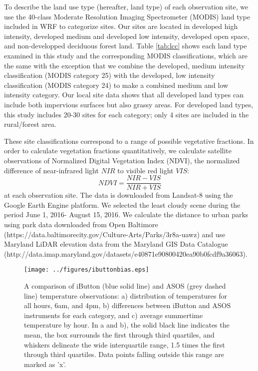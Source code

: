 \documentclass[draft,linenumbers]{agujournal}
\begin{document}
 To describe the land use type (hereafter, land type) of each observation site, we use the 40-class Moderate Resolution Imaging Spectrometer (MODIS) land type included in WRF to categorize sites. Our sites are located in developed high intensity, developed medium and developed low intensity, developed open space, and non-developped deciduous forest land.
 Table \ref{tab:lcc} shows each land type examined in this study and the corresponding MODIS classifications, which are the same with the exception that we combine the developed, medium intensity classification (MODIS category 25) with the developed, low intensity classification (MODIS category 24) to make a combined medium and low intensity category. Our local site data shows that all developed land types can include both impervious surfaces but also grassy areas. 
For developed land types, this study includes 20-30 sites for each category; only 4 sites are included in the rural/forest area. 

These site classifications correspond to a range of possible vegetative fractions. In order to calculate vegetation fractions quantitatively, we calculate satellite observations of Normalized Digital Vegetation Index (NDVI), the normalized difference of near-infrared light $NIR$ to visible red light $VIS$: 
\[NDVI = \frac{NIR-VIS}{NIR+VIS}\]
at each observation site. The data is downloaded from Landsat-8 using the Google Earth Engine platform. We selected the least cloudy scene during the period June 1, 2016- August 15, 2016.  
We calculate the distance to urban parks using park data downloaded from Open Baltimore (https://data.baltimorecity.gov/Culture-Arts/Parks/3r8a-uawz) and use Maryland LiDAR elevation data from the Maryland GIS Data Catalogue (http://data.imap.maryland.gov/datasets/e40871e90800420ea90b0fcdf9a36063). 

\begin{figure}
\centering
\texttt{[image: ../figures/ibuttonbias.eps]}
\caption{A comparison of iButton (blue solid line) and ASOS (grey dashed line) temperature observations: a) distribution of temperatures for all hours,  6am, and 4pm, b) differences between iButton and ASOS instruments for each category, and c) average summertime temperature by hour. In a and b), the solid black line indicates the mean, the box surrounds the first through third quartiles, and whiskers delineate the wide interquartile range, 1.5 times the first through third quartiles. Data points falling outside this range are marked as 'x'. }
\label{fig:bias}
\end{figure}
\end{document}
